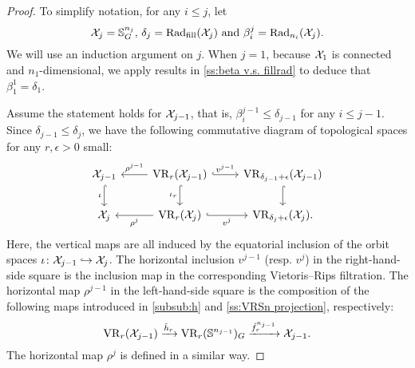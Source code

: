 \begin{proof}
    To simplify notation, for any $i \leq j$, let
    \[
        \mathcal{X}_j = \mathbb{S}^{n_j}_G, \,\delta_j = \mathrm{Rad}_{\mathrm{fill}}(\mathcal{X}_j) \text{ and }\beta_i^j = \mathrm{Rad}_{n_i}(\mathcal{X}_j).
    \]
	We will use an induction argument on $j$.
	When $j = 1$, because $\mathcal{X}_1$ is connected and $n_1$-dimensional, we apply results in \cref{ss:beta v.s. fillrad} to deduce that $\beta_1^1 = \delta_1$.

	Assume the statement holds for $\mathcal{X}_{j-1}$, that is, $\beta_i^{j-1} \leq \delta_{j-1}$ for any $i \leq j-1$.
	Since $\delta_{j-1} \leq \delta_j$, we have the following commutative diagram of topological spaces for any $r,\epsilon>0$ small:
    \begin{equation}\label{d:fundamental_bars_diagram}
        \begin{tikzcd}
            \cX_{j-1}
            \ar[d, hook,"{\iota}" left]
            &
            \VR_r(\cX_{j-1})
            \ar[d, hook,"\iota_r" left]
            \ar[l, "\rho^{j-1}" above]
            \ar[r, hook, "v^{j-1}"]
            &
            \VR_{\delta_{j-1}+\epsilon}(\cX_{j-1})
            \ar[d, hook]
            \\
            \cX_j
            &
            \VR_r(\cX_j)
            \ar[l, "\rho^j" below]
            \ar[r, hook, "v^j" below]
            &
            \VR_{\delta_j+\epsilon}(\cX_j).
        \end{tikzcd}
    \end{equation}
    Here, the vertical maps are all induced by the equatorial inclusion of the orbit spaces $\iota \colon \mathcal{X}_{j-1} \hookrightarrow \mathcal{X}_j$.
    The horizontal inclusion $v^{j-1}$ (resp. $v^j$) in the right-hand-side square is the inclusion map in the corresponding Vietoris--Rips filtration.
    The horizontal map $\rho^{j-1}$ in the left-hand-side square is the composition of the following maps introduced in \cref{subsub:h} and \cref{ss:VRSn projection}, respectively:
    \[\mathrm{VR}_r(\mathcal{X}_{j-1}) \xrightarrow{\tilde{h}_r}\mathrm{VR}_r(\mathbb{S}^{n_{j-1}})_G \xrightarrow{\tilde{f}_r^{n_{j-1}}} \mathcal{X}_{j-1}.\]
    The horizontal map $\rho^j$ is defined in a similar way.


\end{proof}
